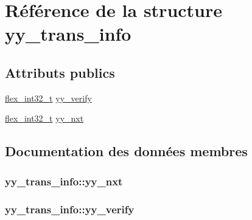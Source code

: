 \hypertarget{structyy__trans__info}{}\section{Référence de la structure yy\+\_\+trans\+\_\+info}
\label{structyy__trans__info}
\subsection*{Attributs publics}
\begin{DoxyCompactItemize}
\item 
\hyperlink{code_8cpp_a838ce943cf44ef7769480714fc6c3ba9}{flex\+\_\+int32\+\_\+t} \hyperlink{structyy__trans__info_a5c9f61e770deef50bd4e697310342fe9}{yy\+\_\+verify}
\item 
\hyperlink{code_8cpp_a838ce943cf44ef7769480714fc6c3ba9}{flex\+\_\+int32\+\_\+t} \hyperlink{structyy__trans__info_ae0715250c2bef261e596e77e0030f13e}{yy\+\_\+nxt}
\end{DoxyCompactItemize}


\subsection{Documentation des données membres}
\hypertarget{structyy__trans__info_ae0715250c2bef261e596e77e0030f13e}{}
\subsubsection[{yy\+\_\+nxt}]{ yy\+\_\+trans\+\_\+info\+::yy\+\_\+nxt}\label{structyy__trans__info_ae0715250c2bef261e596e77e0030f13e}
\hypertarget{structyy__trans__info_a5c9f61e770deef50bd4e697310342fe9}{}
\subsubsection[{yy\+\_\+verify}]{ yy\+\_\+trans\+\_\+info\+::yy\+\_\+verify}\label{structyy__trans__info_a5c9f61e770deef50bd4e697310342fe9}


